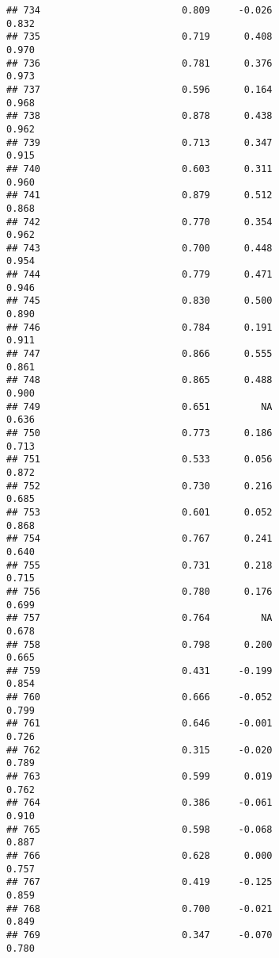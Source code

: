 \documentclass[
]{article}
\begin{document}
\begin{verbatim}
## 734                         0.809     -0.026                     0.832
## 735                         0.719      0.408                     0.970
## 736                         0.781      0.376                     0.973
## 737                         0.596      0.164                     0.968
## 738                         0.878      0.438                     0.962
## 739                         0.713      0.347                     0.915
## 740                         0.603      0.311                     0.960
## 741                         0.879      0.512                     0.868
## 742                         0.770      0.354                     0.962
## 743                         0.700      0.448                     0.954
## 744                         0.779      0.471                     0.946
## 745                         0.830      0.500                     0.890
## 746                         0.784      0.191                     0.911
## 747                         0.866      0.555                     0.861
## 748                         0.865      0.488                     0.900
## 749                         0.651         NA                     0.636
## 750                         0.773      0.186                     0.713
## 751                         0.533      0.056                     0.872
## 752                         0.730      0.216                     0.685
## 753                         0.601      0.052                     0.868
## 754                         0.767      0.241                     0.640
## 755                         0.731      0.218                     0.715
## 756                         0.780      0.176                     0.699
## 757                         0.764         NA                     0.678
## 758                         0.798      0.200                     0.665
## 759                         0.431     -0.199                     0.854
## 760                         0.666     -0.052                     0.799
## 761                         0.646     -0.001                     0.726
## 762                         0.315     -0.020                     0.789
## 763                         0.599      0.019                     0.762
## 764                         0.386     -0.061                     0.910
## 765                         0.598     -0.068                     0.887
## 766                         0.628      0.000                     0.757
## 767                         0.419     -0.125                     0.859
## 768                         0.700     -0.021                     0.849
## 769                         0.347     -0.070                     0.780

\end{verbatim}
\end{document}
